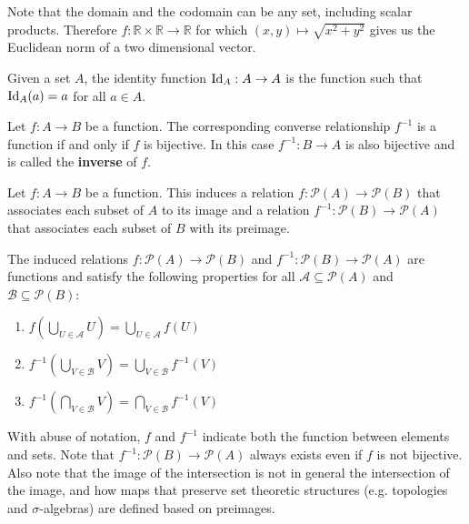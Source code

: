 \documentclass{bareminimum}
\begin{document}
\begin{remark}
	Note that the domain and the codomain can be any set, including scalar products. Therefore $f : \mathbb{R} \times \mathbb{R} \to \mathbb{R}$ for which $(x,y) \mapsto \sqrt{x^2 + y^2}$ gives us the Euclidean norm of a two dimensional vector.
\end{remark}

\begin{defn}
	Given a set $A$,  the identity function $\operatorname{Id}_A : A \to A$ is the function such that $\operatorname{Id}_A(a) = a$ for all $a \in A$.
\end{defn}

\begin{prop}
	Let $f : A \to B$  be a function. The corresponding converse relationship $f^{-1}$ is a function if and only if $f$ is bijective. In this case $f^{-1} : B \to A$ is also bijective and is called the \textbf{inverse} of $f$.
\end{prop}

\begin{defn}
	Let $f : A \to B$  be a function. This induces a relation $f : \mathcal{P}(A) \to \mathcal{P}(B)$ that associates each subset of $A$ to its image and a relation $f^{-1} : \mathcal{P}(B) \to \mathcal{P}(A)$ that associates each subset of $B$ with its preimage.
\end{defn}

\begin{prop}
	The induced relations $f : \mathcal{P}(A) \to \mathcal{P}(B)$ and $f^{-1} : \mathcal{P}(B) \to \mathcal{P}(A)$ are functions and satisfy the following properties for all $\mathcal{A} \subseteq \mathcal{P}(A)$ and $\mathcal{B} \subseteq \mathcal{P}(B)$:
	\begin{enumerate}
		\item $f(\bigcup\limits_{U \in \mathcal{A}} U) = \bigcup\limits_{U \in \mathcal{A}} f(U)$
		\item $f^{-1}(\bigcup\limits_{V \in \mathcal{B}} V) = \bigcup\limits_{V \in \mathcal{B}} f^{-1}(V)$
		\item $f^{-1}(\bigcap\limits_{V \in \mathcal{B}} V) = \bigcap\limits_{V \in \mathcal{B}} f^{-1}(V)$
	\end{enumerate}
\end{prop}

\begin{remark}
	With abuse of notation, $f$ and $f^{-1}$ indicate both the function between elements and sets. Note that $f^{-1} : \mathcal{P}(B) \to \mathcal{P}(A)$ always exists even if $f$ is not bijective. Also note that the image of the intersection is not in general the intersection of the image, and how maps that preserve set theoretic structures (e.g. topologies and $\sigma$-algebras) are defined based on preimages.
\end{remark}
\end{document}
